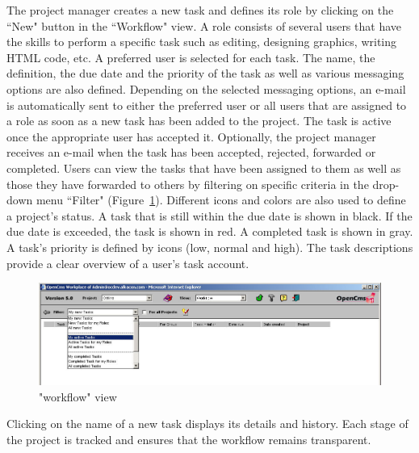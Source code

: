 The project manager creates a new task and defines its role by
clicking on the ``New" button in the ``Workflow" view. A role consists
of several users that have the skills to perform a specific task
such as editing, designing graphics, writing HTML code, etc. A
preferred user is selected for each task. The name, the
definition, the due date and the priority of the task as well as
various messaging options are also defined. Depending on the
selected messaging options, an e-mail is automatically sent to
either the preferred user or all users that are assigned to a role
as soon as a new task has been added to the project. The task is
active once the appropriate user has accepted it. Optionally, the
project manager receives an e-mail when the task has been
accepted, rejected, forwarded or completed. Users can view the
tasks that have been assigned to them as well as those they have
forwarded to others by filtering on specific criteria in the
drop-down menu ``Filter" (Figure~\ref{taskview}). Different icons
and colors are also used to define a project's status. A task that
is still within the due date is shown in black. If the due date is
exceeded, the task is shown in red. A completed task is shown in
gray. A task's priority is defined by icons (low, normal and
high). The task descriptions provide a clear overview of a user's
task account.

\begin{figure}[!hbt]
\begin{center}
\includegraphics[width=\sgw]
                   {pics/usermanual/taskView}
\caption["workflow" view]
           {"workflow" view}
\label{taskview}
\end{center}
\end{figure}

Clicking on the name of a new task displays its details and
history. Each stage of the project is tracked and ensures that the
workflow remains transparent.
